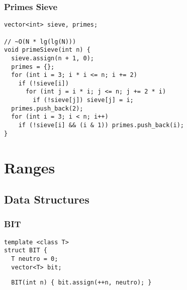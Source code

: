 \documentclass[twoside]{article}
\begin{document}
\begin{multicols*}{2}
\subsubsectionfont{\large\bfseries\sffamily\underline}
\subsubsection*{Primes Sieve}
\begin{verbatim}
vector<int> sieve, primes;

// ~O(N * lg(lg(N)))
void primeSieve(int n) {
  sieve.assign(n + 1, 0);
  primes = {};
  for (int i = 3; i * i <= n; i += 2)
    if (!sieve[i])
      for (int j = i * i; j <= n; j += 2 * i)
        if (!sieve[j]) sieve[j] = i;
  primes.push_back(2);
  for (int i = 3; i < n; i++)
    if (!sieve[i] && (i & 1)) primes.push_back(i);
}
\end{verbatim}

\sectionfont{\bfseries\sffamily\centering\Huge}
\vspace{1em}
\section*{Ranges}
\vspace{3em}
\subsectionfont{\bfseries\sffamily\centering\LARGE}
\vspace{0em}
\subsection*{Data Structures}
\vspace{2em}
\subsubsectionfont{\large\bfseries\sffamily\underline}
\subsubsection*{BIT}
\begin{verbatim}
template <class T>
struct BIT {
  T neutro = 0;
  vector<T> bit;
\end{verbatim}
\vspace{-12pt}
\begin{verbatim}
  BIT(int n) { bit.assign(++n, neutro); }


\end{verbatim}
\end{multicols*}
\end{document}
